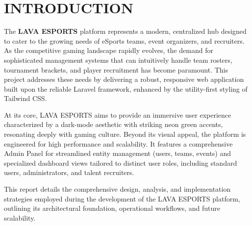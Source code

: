 \chapter{INTRODUCTION}

The \textbf{LAVA ESPORTS} platform represents a modern, centralized hub designed to cater to the growing needs of eSports teams, event organizers, and recruiters. As the competitive gaming landscape rapidly evolves, the demand for sophisticated management systems that can intuitively handle team rosters, tournament brackets, and player recruitment has become paramount. This project addresses these needs by delivering a robust, responsive web application built upon the reliable Laravel framework, enhanced by the utility-first styling of Tailwind CSS.

At its core, LAVA ESPORTS aims to provide an immersive user experience characterized by a dark-mode aesthetic with striking neon green accents, resonating deeply with gaming culture. Beyond its visual appeal, the platform is engineered for high performance and scalability. It features a comprehensive Admin Panel for streamlined entity management (users, teams, events) and specialized dashboard views tailored to distinct user roles, including standard users, administrators, and talent recruiters.

This report details the comprehensive design, analysis, and implementation strategies employed during the development of the LAVA ESPORTS platform, outlining its architectural foundation, operational workflows, and future scalability.
